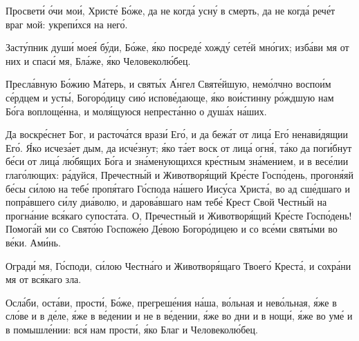 \begin{mymulticols}
Просвет\'{и} \'{о}чи мо\'{и}, Христ\'{е} Б\'{о}же, да не когд\'{а} усн\'{у} в смерть, да не когд\'{а} реч\'{е}т враг мой: укреп\'{и}хся на нег\'{о}.

\slavan

Заст\'{у}пник душ\'{и} мое\'{я} б\'{у}ди, Б\'{о}же, \'{я}ко посред\'{е} хожд\'{у} сет\'{е}й мн\'{о}гих; изб\'{а}ви мя от них и спас\'{и} мя, Бл\'{а}же, \'{я}ко Человекол\'{ю}бец.

\inynen

Пресл\'{а}вную Б\'{о}жию М\'{а}терь, и свят\'{ы}х \'{А}нгел Свят\'{е}йшую, нем\'{о}лчно воспо\'{и}м с\'{е}рдцем и уст\'{ы}, Богор\'{о}дицу си\'{ю} испов\'{е}дающе, \'{я}ко во\'{и}стинну р\'{о}ждшую нам Б\'{о}га воплощ\'{е}нна, и мол\'{я}щуюся непрест\'{а}нно о душ\'{а}х н\'{а}ших.


Да воскр\'{е}снет Бог, и расточ\'{а}тся враз\'{и} Ег\'{о}, и да беж\'{а}т от лиц\'{а} Ег\'{о} ненав\'{и}дящии Ег\'{о}. \'{Я}ко исчез\'{а}ет дым, да исч\'{е}знут; \'{я}ко т\'{а}ет воск от лиц\'{а} огн\'{я}, т\'{а}ко да пог\'{и}бнут б\'{е}си от лиц\'{а} л\'{ю}бящих Б\'{о}га и зн\'{а}менующихся кр\'{е}стным зн\'{а}мением, и в вес\'{е}лии глаг\'{о}лющих: р\'{а}дуйся, Пречестн\'{ы}й и Животвор\'{я}щий Кр\'{е}сте Госп\'{о}день, прогон\'{я}яй б\'{е}сы с\'{и}лою на теб\'{е} проп\'{я}таго Г\'{о}спода н\'{а}шего Иис\'{у}са Христ\'{а}, во ад сш\'{е}дшаго и попр\'{а}вшего с\'{и}лу ди\'{а}волю, и даров\'{а}вшаго нам теб\'{е} Крест Свой Честн\'{ы}й на прогн\'{а}ние вс\'{я}каго супост\'{а}та. О, Пречестн\'{ы}й и Животвор\'{я}щий Кр\'{е}сте Госп\'{о}день! Помог\'{а}й ми со Свят\'{о}ю Госпож\'{е}ю Д\'{е}вою Богор\'{о}дицею и со вс\'{е}ми свят\'{ы}ми во в\'{е}ки. Ам\'{и}нь.


Оград\'{и} мя, Г\'{о}споди, с\'{и}лою Честн\'{а}го и Животвор\'{я}щаго Твоег\'{о} Крест\'{а}, и сохр\'{а}ни мя от вс\'{я}каго зла.


Осл\'{а}би, ост\'{а}ви, прост\'{и}, Б\'{о}же, прегреш\'{е}ния н\'{а}ша, в\'{о}льная и нев\'{о}льная, \'{я}же в сл\'{о}ве и в д\'{е}ле, \'{я}же в в\'{е}дении и не в в\'{е}дении, \'{я}же во дни и в нощ\'{и}, \'{я}же во ум\'{е} и в помышл\'{е}нии: вс\'{я} нам прост\'{и}, \'{я}ко Благ и Человекол\'{ю}бец.



\end{mymulticols}

